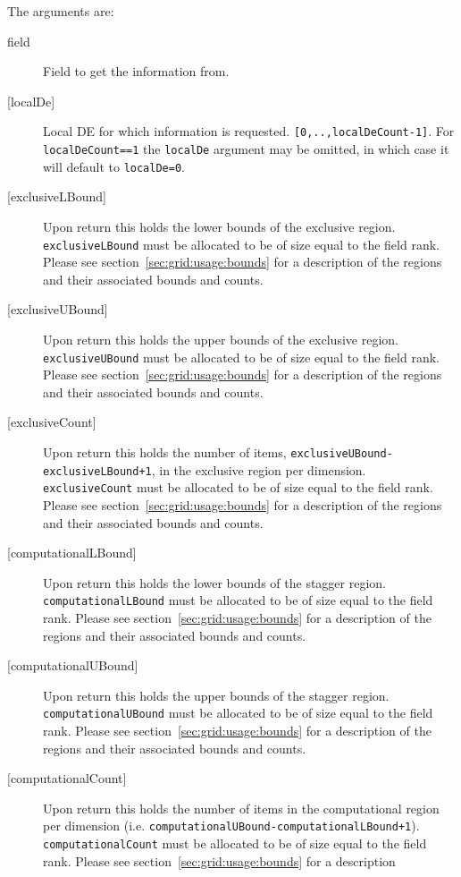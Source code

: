    The arguments are:
   \begin{description}
   \item[field]
   Field to get the information from.
   \item[{[localDe]}]
   Local DE for which information is requested. {\tt [0,..,localDeCount-1]}.
   For {\tt localDeCount==1} the {\tt localDe} argument may be omitted,
   in which case it will default to {\tt localDe=0}.
   \item[{[exclusiveLBound]}]
   Upon return this holds the lower bounds of the exclusive region.
   {\tt exclusiveLBound} must be allocated to be of size equal to the field rank.
   Please see section~\ref{sec:grid:usage:bounds} for a description
   of the regions and their associated bounds and counts.
   \item[{[exclusiveUBound]}]
   Upon return this holds the upper bounds of the exclusive region.
   {\tt exclusiveUBound} must be allocated to be of size equal to the field rank.
   Please see section~\ref{sec:grid:usage:bounds} for a description
   of the regions and their associated bounds and counts.
   \item[{[exclusiveCount]}]
   Upon return this holds the number of items, {\tt exclusiveUBound-exclusiveLBound+1},
   in the exclusive region per dimension.
   {\tt exclusiveCount} must
   be allocated to be of size equal to the field rank.
   Please see section~\ref{sec:grid:usage:bounds} for a description
   of the regions and their associated bounds and counts.
   \item[{[computationalLBound]}]
   Upon return this holds the lower bounds of the stagger region.
   {\tt computationalLBound} must be allocated to be of size equal to the field rank.
   Please see section~\ref{sec:grid:usage:bounds} for a description
   of the regions and their associated bounds and counts.
   \item[{[computationalUBound]}]
   Upon return this holds the upper bounds of the stagger region.
   {\tt computationalUBound} must be allocated to be of size equal to the field rank.
   Please see section~\ref{sec:grid:usage:bounds} for a description
   of the regions and their associated bounds and counts.
   \item[{[computationalCount]}]
   Upon return this holds the number of items in the computational region per dimension
   (i.e. {\tt computationalUBound-computationalLBound+1}). {\tt computationalCount}
   must be allocated to be of size equal to the field rank.
   Please see section~\ref{sec:grid:usage:bounds} for a description

\end{description}
